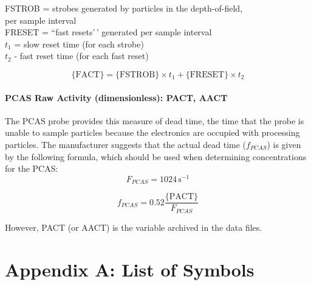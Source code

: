 \documentclass[
  english,
]{book}
\begin{document}
FSTROB = strobes generated by particles in the depth-of-field,\\
\hspace*{0.333em}\hspace*{0.333em}\hspace*{0.333em}\hspace*{0.333em}\hspace*{0.333em}\hspace*{0.333em}\hspace*{0.333em}\hspace*{0.333em}\hspace*{0.333em}\hspace*{0.333em}per sample interval\\
FRESET = ``fast resets'\,' generated per sample interval\\
\(t_{1}\) = slow reset time (for each strobe)\\
\(t_{2}\) - fast reset time (for each fast reset)

\begin{equation}
\mathrm{\{FACT\}=\{FSTROB\}}\times t_{1}+\mathrm{\{FRESET\}}\times t_{2}
\label{eq:FACTbox}
\end{equation}

\hypertarget{AACT}{%
\subsubsection*{PCAS Raw Activity (dimensionless): PACT, AACT}\label{AACT}}

The PCAS probe provides this measure of dead time, the time that the probe is unable to sample particles because the electronics are occupied with processing particles. The manufacturer suggests that the actual dead time (\(f_{PCAS}\)) is given by the following formula, which should be used when determining concentrations for the PCAS:\\

\[F_{PCAS} = 1024\,\mathrm{s}^{-1}\]

\begin{equation}
f_{PCAS} = 0.52\frac{\mathrm{\{PACT\}}}{F_{PCAS}}
\label{eq:fPCAS}
\end{equation}

However, PACT (or AACT) is the variable archived in the data files.

\hypertarget{appendix-appendix}{%
\appendix}


\hypertarget{appendix-a-list-of-symbols}{%
\chapter*{Appendix A: List of Symbols}\label{appendix-a-list-of-symbols}}
\end{document}

